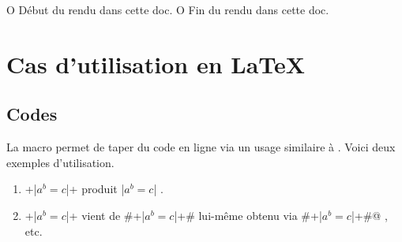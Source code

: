


\usepackage[lang = FR]{../main/main}
\usepackage{../macroenv/macroenv}
\usepackage{../inenglish/inenglish}
\usepackage{../showcase/showcase}
\usepackage{../rem-exa/rem-exa}


\usepackage{listing}





                       { O{ Début du rendu dans cette doc. }
                         O{ Fin du rendu dans cette doc. } }{
    \begin{colorstrip}{green!5}
        \smallskip
}{
        \smallskip
        \bdocextraruler{#2}
    \end{colorstrip}
}




\section{Cas d'utilisation en \LaTeX}

\subsection{Codes }

La macro  permet de taper du code en ligne via un usage similaire à .
Voici deux exemples d'utilisation.

\begin{enumerate}
    \item \bdocinlatex+\bdocinlatex|$a^b = c$|+ produit \bdocinlatex|$a^b = c$| .

    \item \bdocinlatex+\bdocinlatex|$a^b = c$|+ vient de \bdocinlatex#\bdocinlatex+\bdocinlatex|$a^b = c$|+# lui-même obtenu via \bdocinlatex@\bdocinlatex#\bdocinlatex+\bdocinlatex|$a^b = c$|+#@ , etc.
\end{enumerate}


